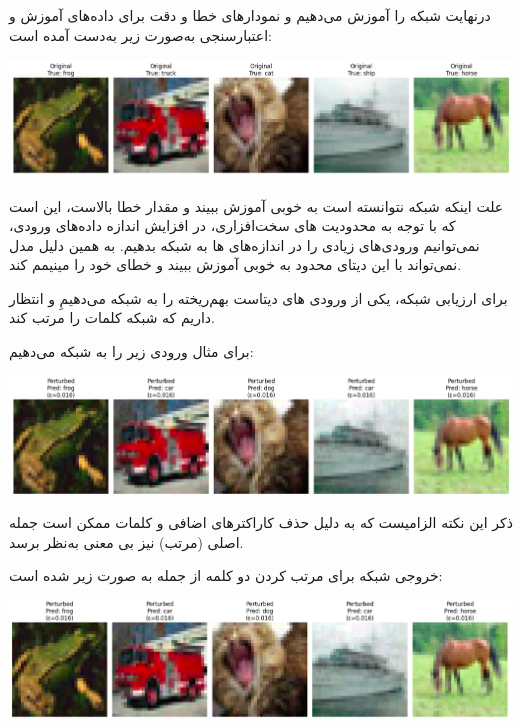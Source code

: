 \begin{qsolve}
	
	درنهایت شبکه را آموزش می‌دهیم و نمودار‌های خطا و دقت برای داده‌های آموزش و اعتبارسنجی به‌صورت زیر به‌دست آمده است:
\end{qsolve}



\begin{qsolve}
	\begin{center}
		\includegraphics*[width=1\linewidth]{pics/img8.png}
		\label{نمودار‌های دقت و خطا}
	\end{center}
	
	
	علت اینکه شبکه نتوانسته است به خوبی آموزش ببیند و مقدار خطا بالاست، این است که با توجه به محدودیت های سخت‌افزاری،  در افزایش اندازه داده‌های ورودی، نمی‌توانیم ورودی‌های زیادی را در اندازه‌های ها به شبکه بدهیم. به همین دلیل مدل نمی‌تواند با این دیتای محدود به خوبی آموزش ببیند و خطای خود را مینیمم کند.
	
	
	برای ارزیابی شبکه، یکی از ورودی های دیتاست بهم‌ریخته را به شبکه می‌دهیمِ و انتظار داریم که شبکه کلمات را مرتب کند.
	
	برای مثال ورودی زیر را به شبکه می‌دهیم:
	
	\begin{center}
		\includegraphics*[width=1\linewidth]{pics/img9.png}
		\label{جمله ورودی و خروجی مطلوب}
	\end{center}
	
	ذکر این نکته الزامیست که به دلیل حذف کاراکتر‌های اضافی و کلمات  ممکن است جمله اصلی (مرتب) نیز بی معنی به‌نظر برسد.
	
	خروجی شبکه برای مرتب کردن دو کلمه از جمله به صورت زیر شده است:
	
	\begin{center}
		\includegraphics*[width=0.5\linewidth]{pics/img10.png}
		\label{خروجی مرتب شده}
	\end{center}
	
	
	
	
\end{qsolve}